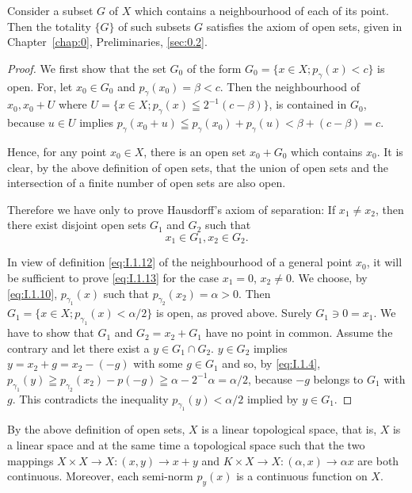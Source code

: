 Consider a subset $G$ of $X$ which contains a neighbourhood of each of its point. Then the totality $\{G\}$ of such subsets $G$ satisfies the axiom of open sets, given in Chapter~\ref{chap:0}, Preliminaries, \ref{sec:0.2}. 

\begin{proof}
 We first show that the set $G_0$ of the form $G_0 = \{x \in X; p_\gamma(x) < c\}$ is open. For, let $x_0 \in G_0$ and $p_\gamma(x_0) = \beta < c$. Then the neighbourhood of $x_0, x_0 + U$ where $U = \{x \in X; p_\gamma(x) \leqq 2^{-1}(c- \beta)\}$, is contained in $G_0$, because $u \in U$ implies $p_\gamma(x_0 + u) \leqq p_\gamma(x_0) + p_\gamma(u) < \beta + (c- \beta) = c$. 

Hence, for any point $x_0 \in X$, there is an open set $x_0 + G_0$ which contains $x_0$. It is clear, by the above definition of open sets, that the union of open sets and the intersection of a finite number of open sets are also open. 

Therefore we have only to prove Hausdorff's axiom of separation: If $x_{1} \neq x_{2}$, then there exist disjoint open sets $G_{1}$ and $G_{2}$ such that 
\begin{equation}\label{eq:I.1.13}
x_{1} \in G_{1}, x_{2} \in G_{2}.
\end{equation}

In view of definition \eqref{eq:I.1.12} of the neighbourhood of a general point $x_0$, it will be sufficient to prove \eqref{eq:I.1.13} for the case $x_1 = 0$, $x_2 \neq 0$. We choose, by \eqref{eq:I.1.10}, $p_{\gamma_1}(x)$ such that $p_{\gamma_2}(x_2) = \alpha > 0$. Then $G_1 = \{x \in X; p_{\gamma_1}(x) < \alpha / 2\}$ is open, as proved above. Surely $G_1 \ni 0 = x_1$. We have to show that $G_1$ and $G_2 = x_2 + G_1$ have no point in common. Assume the contrary and let there exist a $y \in G_1 \cap G_2$. $y \in G_2$ implies $y = x_2 + g = x_2- (-g)$ with some $g \in G_1$ and so, by \eqref{eq:I.1.4}, $p_{\gamma_1}(y) \geqq p_{\gamma_2}(x_2)- p(-g) \geqq \alpha- 2^{-1}\alpha = \alpha / 2$, because $-g$ belongs to $G_1$ with $g$. This contradicts the inequality $p_{\gamma_1}(y) < \alpha / 2$ implied by $y \in G_1$. 
\end{proof}

\begin{proposition}\label{prop:I.1.Proposition.4} By the above definition of open sets, $X$ is a linear topological space, that is, $X$ is a linear space and at the same time a topological space such that the two mappings $X \times X \to X : (x, y) \to x + y$ and $K \times X \to X : (\alpha, x) \to \alpha x$ are both continuous. Moreover, each semi-norm $p_{y}(x)$ is a continuous function on $X$. 
\end{proposition}

